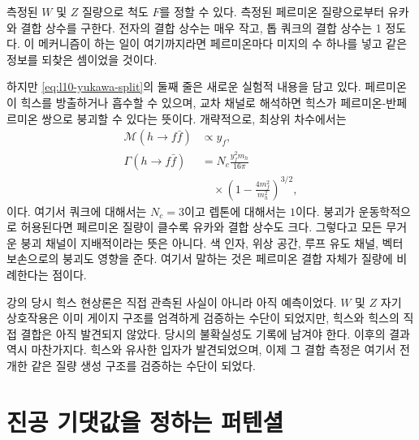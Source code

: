 측정된 \(W\) 및 \(Z\) 질량으로 척도 \(F\)를 정할 수 있다. 측정된 페르미온 질량으로부터 유카와 결합 상수를 구한다. 전자의 결합 상수는 매우 작고, 톱 쿼크의 결합 상수는 1 정도다. 이 메커니즘이 하는 일이 여기까지라면 페르미온마다 미지의 수 하나를 넣고 같은 정보를 되찾은 셈이었을 것이다.

하지만 \eqref{eq:l10-yukawa-split}의 둘째 줄은 새로운 실험적 내용을 담고 있다. 페르미온이 힉스를 방출하거나 흡수할 수 있으며, 교차 채널로 해석하면 힉스가 페르미온-반페르미온 쌍으로 붕괴할 수 있다는 뜻이다. 개략적으로, 최상위 차수에서는
\begin{equation}
\begin{aligned}
  \mathcal M(h\to f\bar f)&\propto y_f,
  \\
  \Gamma(h\to f\bar f)
  &=
  N_c\frac{y_f^2m_h}{16\pi}
  \\
  &\quad\times
  \left(1-\frac{4m_f^2}{m_h^2}\right)^{3/2},
\end{aligned}
  \label{eq:l10-higgs-fermion-width}
\end{equation}
이다. 여기서 쿼크에 대해서는 \(N_c=3\)이고 렙톤에 대해서는 \(1\)이다. 붕괴가 운동학적으로 허용된다면 페르미온 질량이 클수록 유카와 결합 상수도 크다. 그렇다고 모든 무거운 붕괴 채널이 지배적이라는 뜻은 아니다. 색 인자, 위상 공간, 루프 유도 채널, 벡터 보손으로의 붕괴도 영향을 준다. 여기서 말하는 것은 페르미온 결합 자체가 질량에 비례한다는 점이다.

\begin{classroomqa}
\end{classroomqa}

강의 당시 힉스 현상론은 직접 관측된 사실이 아니라 아직 예측이었다. \(W\) 및 \(Z\) 자기 상호작용은 이미 게이지 구조를 엄격하게 검증하는 수단이 되었지만, 힉스와 힉스의 직접 결합은 아직 발견되지 않았다. 당시의 불확실성도 기록에 남겨야 한다. 이후의 결과 역시 마찬가지다. 힉스와 유사한 입자가 발견되었으며, 이제 그 결합 측정은 여기서 전개한 같은 질량 생성 구조를 검증하는 수단이 되었다.

\section{진공 기댓값을 정하는 퍼텐셜}

